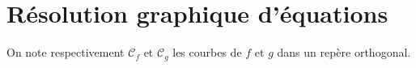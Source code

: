 \documentclass[11pt]{article}
\newcommand{\Cf}{\mathscr{C}_f}
\newcommand{\Cg}{\mathscr{C}_g}
\begin{document}
%

\section{Résolution graphique d'équations}
\noindent On note respectivement $\Cf$ et $\Cg$ les courbes de $f$ et $g$ dans
un repère orthogonal.
\end{document}
